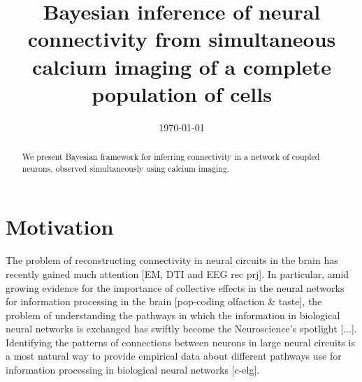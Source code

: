 \documentclass[amsmath,amssymb]{revtex4}
\begin{document}
\date{\today}
\title{Bayesian inference of neural connectivity from simultaneous
calcium imaging of a complete population of cells}
\begin{abstract}
We present Bayesian framework for inferring connectivity in a network
of coupled neurons, observed simultaneously using calcium imaging.
\end{abstract}
\maketitle

\section{\label{sec1}Motivation}
The problem of reconstructing connectivity in neural circuits in the brain has recently
gained much attention [EM, DTI and EEG rec prj]. In particular, amid growing evidence for the importance of collective effects in the neural networks for information processing in the brain [pop-coding olfaction \& taste], the problem of understanding the pathways in which the information in biological neural networks is exchanged has swiftly become the Neuroscience's spotlight [...]. Identifying the patterns of connections between neurons in large neural circuits is a most natural way to provide empirical data about different pathways use for information processing in biological neural networks [c-elg].
\end{document}
